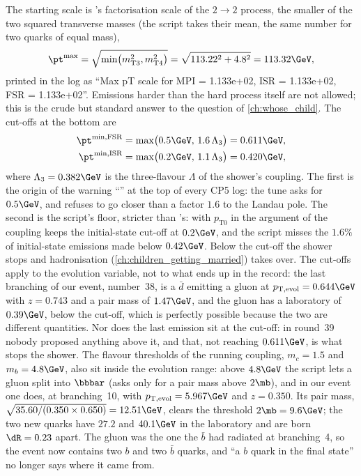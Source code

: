 The starting scale is \PYTHIA's factorisation scale of the $2\to2$ process,
the smaller of the two squared transverse masses (the script takes their
mean, the same number for two quarks of equal mass),
\begin{equation}
  \pt^{\max}=\sqrt{\min\bigl(m_{\mathrm{T}3}^2,m_{\mathrm{T}4}^2\bigr)}=\sqrt{113.22^2+4.8^2}=113.32\GeV ,
  \label{eq:mother_gives_birth:ptmax}
\end{equation}
printed in the log as ``Max pT scale for MPI = 1.133e+02, ISR = 1.133e+02,
FSR = 1.133e+02''. Emissions harder than the hard process itself are not
allowed; this is the crude but standard answer to the question of
\cref{ch:whose_child}. The cut-offs at the bottom are
\begin{equation}
\begin{aligned}
  \pt^{\min,\mathrm{FSR}}&=\max\bigl(0.5\GeV,\,1.6\,\Lambda_3\bigr)=0.611\GeV,\\
  \pt^{\min,\mathrm{ISR}}&=\max\bigl(0.2\GeV,\,1.1\,\Lambda_3\bigr)=0.420\GeV,
\end{aligned}
  \label{eq:mother_gives_birth:ptmin}
\end{equation}
where $\Lambda_3=0.382\GeV$ is the three-flavour $\Lambda$ of the shower's
coupling. The first is the origin of the warning
``'' at the top
of every CP5 log: the tune asks for $0.5\GeV$, and \PYTHIA refuses to go
closer than a factor $1.6$ to the Landau pole. The second is the script's
floor, stricter than \PYTHIA's: with $p_{\mathrm{T}0}$ in the argument of
the coupling \PYTHIA keeps the initial-state cut-off at $0.2\GeV$, and
the script misses the $1.6\%$ of initial-state emissions made below
$0.42\GeV$. Below the cut-off the
shower stops and hadronisation (\cref{ch:children_getting_married}) takes over.
The cut-offs apply to the evolution variable, not to what ends up in the
record: the last branching of our event, number~38, is a $\bar d$ emitting
a gluon at $\ptevol=0.644\GeV$ with $z=0.743$ and a pair mass of
$1.47\GeV$, and the gluon has a laboratory \pt of $0.39\GeV$, below the
cut-off, which is perfectly possible because the two are different
quantities. Nor does the last emission sit at the cut-off: in round~39
nobody proposed anything above it, and that, not reaching $0.611\GeV$, is
what stops the shower. The flavour thresholds of the running coupling,
$m_c=1.5$ and $m_b=4.8\GeV$, also sit inside the evolution range: above
$4.8\GeV$ the script lets a gluon split into $\bbbar$ (\PYTHIA asks only
for a pair mass above $2\mb$), and in our event one does, at
branching~10, with $\ptevol=5.967\GeV$ and $z=0.350$. Its pair mass,
$\sqrt{35.60/(0.350\times0.650)}=12.51\GeV$, clears the threshold
$2\mb=9.6\GeV$; the two new quarks have $27.2$ and $40.1\GeV$ in the
laboratory and are born $\dR=0.23$ apart. The gluon was the one the
$\bar b$ had radiated at branching~4, so the event now contains two $b$
and two $\bar b$ quarks, and ``a $b$ quark in the final state'' no longer
says where it came from.

